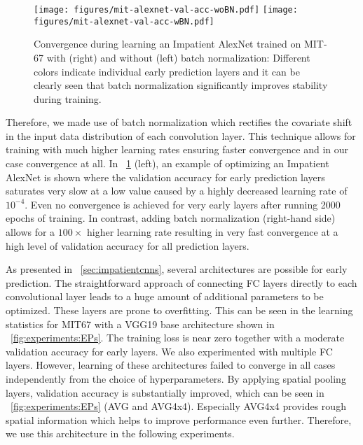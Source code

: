 \documentclass{bmvc2k}
\begin{document}
    \begin{figure}[t]
        \centering
        \texttt{[image: figures/mit-alexnet-val-acc-woBN.pdf]} \hfil %
        \texttt{[image: figures/mit-alexnet-val-acc-wBN.pdf]}  %
        \caption{Convergence during learning an Impatient AlexNet trained on MIT-67 with (right) and without (left) batch normalization:
            Different colors indicate individual early prediction layers and it can be clearly seen that batch normalization significantly improves
            stability during training.
        }
        \label{fig:experiments:batchNormPlot}
    \end{figure}

    Therefore, we made use of batch normalization \cite{ioffe2015batch} which rectifies the covariate shift in the input data distribution of each convolution layer.
    This technique allows for training with much higher learning rates ensuring faster convergence and in our case convergence at all.
    In \figurename~\ref{fig:experiments:batchNormPlot} (left), an example of optimizing an Impatient AlexNet is shown where the validation accuracy for early prediction layers saturates very slow at a low value caused by a highly decreased learning rate of $10^{-4}$.
    Even no convergence is achieved for very early layers after running 2000 epochs of training.
    In contrast, adding batch normalization (right-hand side) allows for a $100\times$ higher learning rate resulting in very fast convergence at a high level of validation accuracy for all prediction layers.


    As presented in \sectionname~\ref{sec:impatientcnns}, several architectures are possible for early prediction.
    The straightforward approach of connecting FC layers directly to each convolutional layer leads to a huge amount of additional parameters to be optimized.
    These layers are prone to overfitting.
    This can be seen in the learning statistics for MIT67 with a VGG19 base architecture shown in \figurename~\ref{fig:experiments:EPs}.
    The training loss is near zero together with a moderate validation accuracy for early layers.
    We also experimented with multiple FC layers.
    However, learning of these architectures failed to converge in all cases independently from the choice of hyperparameters.
    By applying spatial pooling layers, validation accuracy is substantially improved,
    which can be seen in \figurename~\ref{fig:experiments:EPs} (AVG and AVG4x4).
    Especially AVG4x4 provides rough spatial information which helps to improve performance even further. Therefore, we use this architecture in the following experiments.
\end{document}
